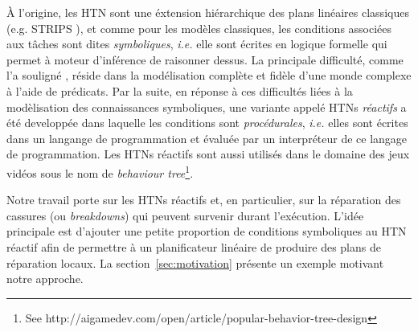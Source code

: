 \documentclass[a4paper,twoside,french]{article}
\begin{document}
				\par \`A l'origine, les HTN sont une \'extension hi\'erarchique des plans lin\'eaires classiques (e.g. STRIPS \cite{fikes1972strips}), et comme pour les modèles classiques, les conditions associ\'ees aux t\^aches sont dites \textit{symboliques}, \emph{i.e.} elle sont \'ecrites en logique formelle qui permet à moteur d'inf\'erence de raisonner dessus. La principale difficulté, comme l'a souligné \cite{les-htnSymb-c-est-nul}, réside dans la modélisation complète et fidèle d'une monde complexe à l'aide de prédicats. Par la suite, en r\'eponse à ces difficult\'es li\'ees \`a la mod\`elisation des connaissances symboliques, une variante appel\'e HTNs \textit{réactifs} a \'et\'e developp\'ee dans laquelle les conditions sont \textit{proc\'edurales}, \emph{i.e.} elles sont \'ecrites dans un langange de programmation et \'evalu\'ee par un interpr\'eteur de ce langage de programmation. Les HTNs réactifs sont aussi utilis\'es dans le domaine des jeux vid\'eos sous le nom de \emph{behaviour tree}\footnote{See http://aigamedev.com/open/article/popular-behavior-tree-design}.
				
				\par Notre travail porte sur les HTNs réactifs et, en particulier, sur la réparation des cassures (ou \emph{breakdowns}) qui peuvent survenir durant l'exécution. L'idée principale est d'ajouter une petite proportion de conditions symboliques au HTN réactif afin de permettre à un planificateur linéaire de produire des plans de réparation locaux. La section~\ref{sec:motivation} présente un exemple motivant notre approche.
\end{document}
